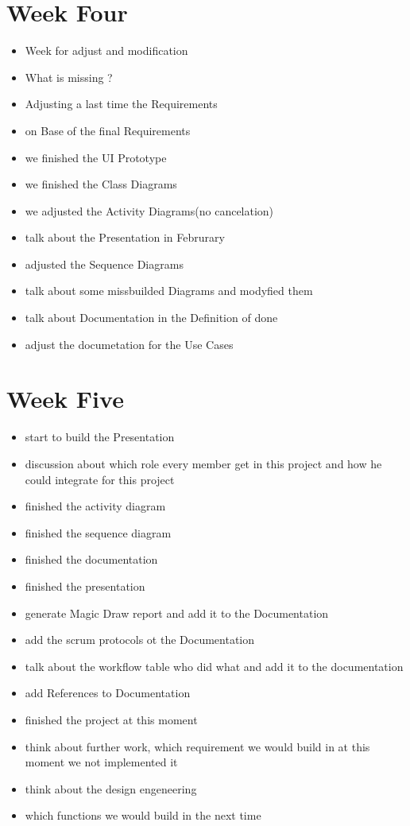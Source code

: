 \documentclass[a4paper, 12pt]{article}
\begin{document}
\section{Week Four}
\begin{itemize}
\item Week for adjust and modification
\item What is missing ? 
\item Adjusting a last time the Requirements 
\item on Base of the final Requirements
\item we finished the UI Prototype 
\item we finished the Class Diagrams
\item we adjusted the Activity Diagrams(no cancelation)
\item talk about the Presentation in Februrary
\item adjusted the Sequence Diagrams
\item talk about some missbuilded Diagrams and modyfied them
\item talk about Documentation in the Definition of done
\item adjust the documetation for the Use Cases 
\end{itemize}
\section{Week Five}
\begin{itemize}
\item start to build the Presentation
\item discussion about which role every member get in this project and how he could integrate for this project
\item finished the activity diagram
\item finished the sequence diagram
\item finished the documentation
\item finished the presentation
\item generate Magic Draw report and add it to the Documentation
\item add the scrum protocols ot the Documentation
\item talk about the workflow table who did what and add it to the documentation
\item add References to Documentation 
\item finished the project at this moment
\item think about further work, which requirement we would build in at this moment we not implemented it
\item think about the design engeneering 
\item which functions we would build in the next time
\end{itemize}
\end{document}
